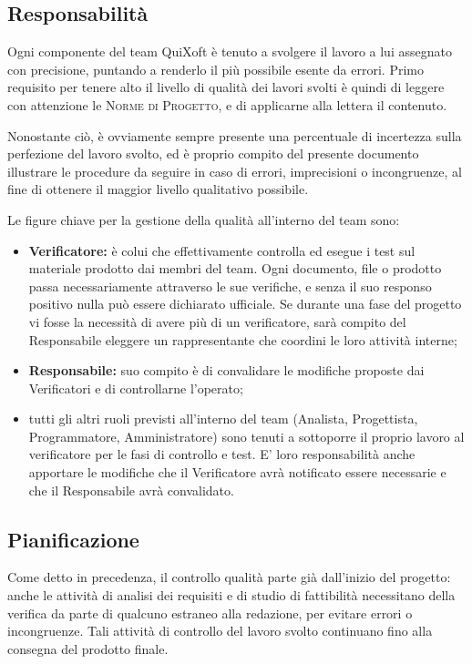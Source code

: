 \documentclass[11pt,a4paper]{article}
\begin{document}
\subsection{Responsabilità}
Ogni componente del team QuiXoft è tenuto a svolgere il lavoro a lui assegnato con precisione, puntando a renderlo il più possibile esente da errori.
Primo requisito per tenere alto il livello di qualità dei lavori svolti è quindi di leggere con attenzione le \textsc{Norme di Progetto}, e di applicarne alla lettera il contenuto.

Nonostante ciò, è ovviamente sempre presente una percentuale di incertezza sulla perfezione del lavoro svolto, ed è proprio compito del presente documento illustrare le procedure da seguire in caso di errori, imprecisioni o incongruenze, al fine di ottenere il maggior livello qualitativo possibile.

Le figure chiave per la gestione della qualità all'interno del team sono:
\begin{itemize}
	\item \textbf{Verificatore:} è colui che effettivamente controlla ed esegue i test sul materiale prodotto dai membri del team. Ogni documento, file o prodotto passa necessariamente attraverso le sue verifiche, e senza il suo responso positivo nulla può essere dichiarato ufficiale. Se durante una fase del progetto vi fosse la necessità di avere più di un verificatore, sarà compito del Responsabile eleggere un rappresentante che coordini le loro attività interne;
	\item \textbf{Responsabile:} suo compito è di convalidare le modifiche proposte dai Verificatori e di controllarne l'operato;
	\item tutti gli altri ruoli previsti all'interno del team (Analista, Progettista, Programmatore, Amministratore) sono tenuti a sottoporre il proprio lavoro al verificatore per le fasi di controllo e test. E' loro responsabilità anche apportare le modifiche che il Verificatore avrà notificato essere necessarie e che il Responsabile avrà convalidato.
\end{itemize}
\subsection{Pianificazione}
Come detto in precedenza, il controllo qualità parte già dall'inizio del progetto: anche le attività di analisi dei requisiti e di studio di fattibilità necessitano della verifica da parte di qualcuno estraneo alla redazione, per evitare errori o incongruenze.
Tali attività di controllo del lavoro svolto continuano fino alla consegna del prodotto finale.
\end{document}
